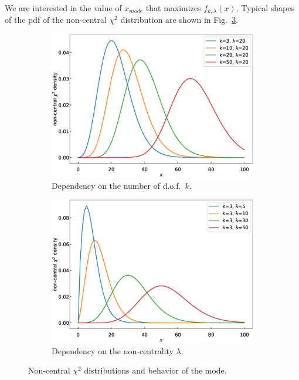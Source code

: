 \documentclass{amsart}
\numberwithin{equation}{section}
\begin{document}
We are interested in the value of $x_{mode}$ that maximizes $f_{k, \lambda}(x)$. Typical shapes of the pdf of the non-central $\chi^2$ distribution are shown in Fig.~\ref{fig:ncx2-curves}.

\begin{figure}[h]
	\centering
	\begin{subfigure}[t]{0.3\textwidth}
		\centering
		\includegraphics[width=\linewidth]{ncx2-of-df.eps}
		\caption{Dependency on the number of d.o.f.~$k$.}\label{fig:ncx2-curves-df}
	\end{subfigure}
	\qquad
	\begin{subfigure}[t]{0.3\textwidth}
		\centering
		\includegraphics[width=\linewidth]{ncx2-of-lambda.eps}
		\caption{Dependency on the non-centrality $\lambda$.}\label{fig:ncx2-curves-lambda}
	\end{subfigure}
	\caption{Non-central $\chi^2$ distributions and behavior of the mode.}\label{fig:ncx2-curves}
\end{figure}
\end{document}

